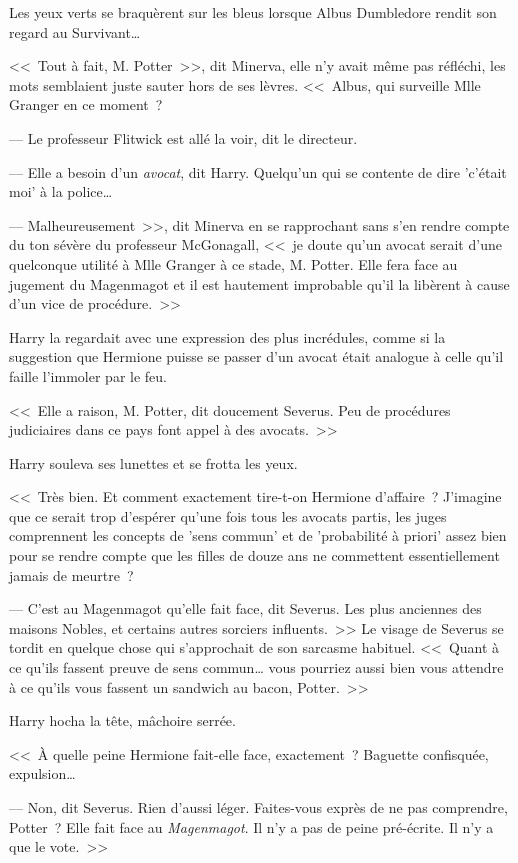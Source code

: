 Les yeux verts se braquèrent sur les bleus lorsque Albus Dumbledore rendit son regard au Survivant…

<<~Tout à fait, M. Potter~>>, dit Minerva, elle n'y avait même pas réfléchi, les mots semblaient juste sauter hors de ses lèvres. <<~Albus, qui surveille Mlle Granger en ce moment~?

--- Le professeur Flitwick est allé la voir, dit le directeur.

--- Elle a besoin d'un \emph{avocat}, dit Harry. Quelqu'un qui se contente de dire 'c'était moi' à la police…

--- Malheureusement~>>, dit Minerva en se rapprochant sans s'en rendre compte du ton sévère du professeur McGonagall, <<~je doute qu'un avocat serait d'une quelconque utilité à Mlle Granger à ce stade, M. Potter. Elle fera face au jugement du Magenmagot et il est hautement improbable qu'il la libèrent à cause d'un vice de procédure.~>>

Harry la regardait avec une expression des plus incrédules, comme si la suggestion que Hermione puisse se passer d'un avocat était analogue à celle qu'il faille l'immoler par le feu.

<<~Elle a raison, M. Potter, dit doucement Severus. Peu de procédures judiciaires dans ce pays font appel à des avocats.~>>

Harry souleva ses lunettes et se frotta les yeux.

<<~Très bien. Et comment exactement tire-t-on Hermione d'affaire~? J'imagine que ce serait trop d'espérer qu'une fois tous les avocats partis, les juges comprennent les concepts de 'sens commun' et de 'probabilité à priori' assez bien pour se rendre compte que les filles de douze ans ne commettent essentiellement jamais de meurtre~?

--- C'est au Magenmagot qu'elle fait face, dit Severus. Les plus anciennes des maisons Nobles, et certains autres sorciers influents.~>> Le visage de Severus se tordit en quelque chose qui s'approchait de son sarcasme habituel. <<~Quant à ce qu'ils fassent preuve de sens commun… vous pourriez aussi bien vous attendre à ce qu'ils vous fassent un sandwich au bacon, Potter.~>>

Harry hocha la tête, mâchoire serrée.

<<~À quelle peine Hermione fait-elle face, exactement~? Baguette confisquée, expulsion…

--- Non, dit Severus. Rien d'aussi léger. Faites-vous exprès de ne pas comprendre, Potter~? Elle fait face au \emph{Magenmagot}. Il n'y a pas de peine pré-écrite. Il n'y a que le vote.~>>

